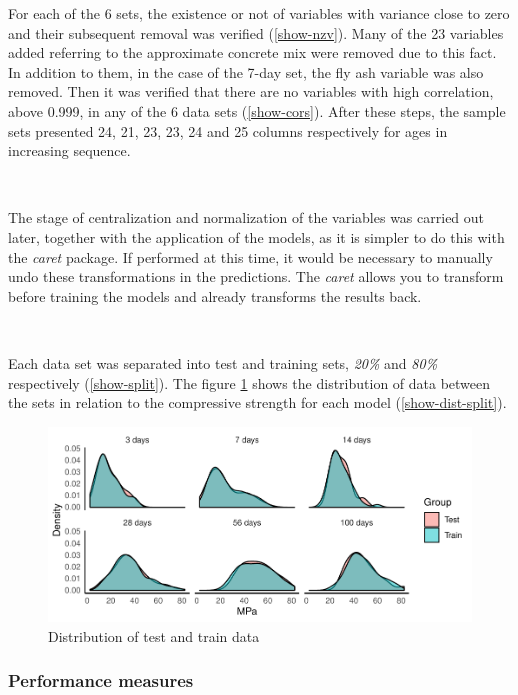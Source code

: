 \documentclass[
]{article}
\begin{document}
For each of the 6 sets, the existence or not of variables with variance
close to zero and their subsequent removal was verified
(\ref{show-nzv}). Many of the 23 variables added referring to the
approximate concrete mix were removed due to this fact. In addition to
them, in the case of the 7-day set, the fly ash variable was also
removed. Then it was verified that there are no variables with high
correlation, above 0.999, in any of the 6 data sets (\ref{show-cors}).
After these steps, the sample sets presented 24, 21, 23, 23, 24 and 25
columns respectively for ages in increasing sequence.

~

The stage of centralization and normalization of the variables was
carried out later, together with the application of the models, as it is
simpler to do this with the \emph{caret} package. If performed at this
time, it would be necessary to manually undo these transformations in
the predictions. The \emph{caret} allows you to transform before
training the models and already transforms the results back.

~

Each data set was separated into test and training sets, \emph{20\%} and
\emph{80\%} respectively (\ref{show-split}). The figure
\ref{fig:dist-split} shows the distribution of data between the sets in
relation to the compressive strength for each model
(\ref{show-dist-split}).

\begin{figure}

{\centering \includegraphics{paper_EN_files/figure-latex/dist-split-1} 

}

\caption{Distribution of test and train data}\label{fig:dist-split}
\end{figure}

\hypertarget{performance-measures}{%
\subsubsection{Performance measures}\label{performance-measures}}
\end{document}
